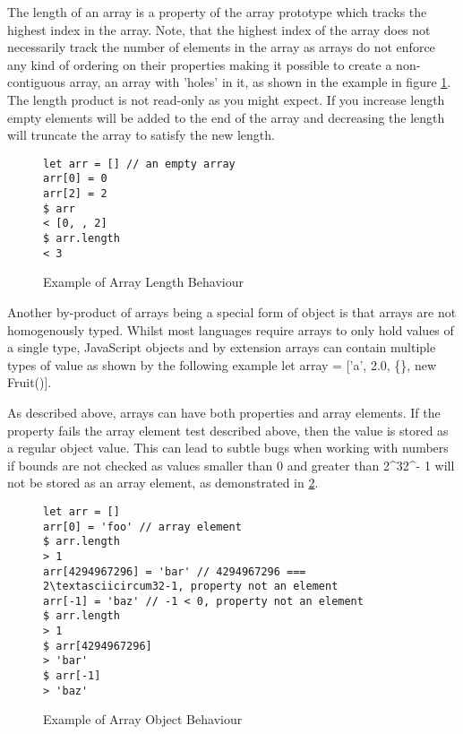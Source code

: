 \documentclass[]{final_report}
\begin{document}
The length of an array is a property of the array prototype which tracks the highest index in the array. Note, that the highest index of the array does not necessarily track the number of elements in the array as arrays do not enforce any kind of ordering on their properties making it possible to create a non-contiguous array, an array with 'holes' in it, as shown in the example in figure \ref{fig:js-array-length}. The length product is not read-only as you might expect. If you increase length empty elements will be added to the end of the array and decreasing the length will truncate the array to satisfy the new length.

\begin{figure}[h]
\begin{verbatim}
let arr = [] // an empty array
arr[0] = 0
arr[2] = 2
$ arr
< [0, , 2]
$ arr.length 
< 3
\end{verbatim}
\caption{\label{fig:js-array-length} Example of Array Length Behaviour}
\end{figure}

Another by-product of arrays being a special form of object is that arrays are not homogenously typed. Whilst most languages require arrays to only hold values of a single type, JavaScript objects and by extension arrays can contain multiple types of value as shown by the following example let array = ['a', 2.0, \{\}, new Fruit()]. 

As described above, arrays can have both properties and array elements. If the property fails the array element test described above, then the value is stored as a regular object value. This can lead to subtle bugs when working with numbers if bounds are not checked as values smaller than 0 and greater than 2\textasciicircum32\textasciicircum - 1 will not be stored as an array element, as demonstrated in \ref{fig:js-array-max-length}.

\begin{figure}[h]
\begin{verbatim}
let arr = []
arr[0] = 'foo' // array element
$ arr.length
> 1
arr[4294967296] = 'bar' // 4294967296 === 2\textasciicircum32-1, property not an element
arr[-1] = 'baz' // -1 < 0, property not an element
$ arr.length
> 1
$ arr[4294967296]
> 'bar'
$ arr[-1]
> 'baz'
\end{verbatim}
\caption{\label{fig:js-array-max-length} Example of Array Object Behaviour }
\end{figure}
\end{document}
